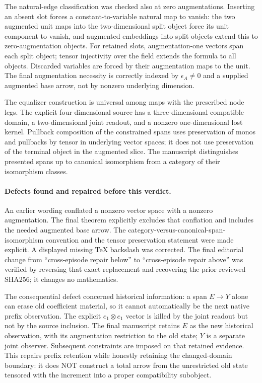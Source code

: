 \documentclass{article}
\begin{document}
The natural-edge classification was checked also at zero augmentations. Inserting an absent slot forces a constant-to-variable natural map to vanish: the two augmented unit maps into the two-dimensional split object force its unit component to vanish, and augmented embeddings into split objects extend this to zero-augmentation objects. For retained slots, augmentation-one vectors span each split object; tensor injectivity over the field extends the formula to all objects. Discarded variables are forced by their augmentation maps to the unit. The final augmentation necessity is correctly indexed by $\epsilon_A\ne0$ and a supplied augmented base arrow, not by nonzero underlying dimension.

The equalizer construction is universal among maps with the prescribed node legs. The explicit four-dimensional source has a three-dimensional compatible domain, a two-dimensional joint readout, and a nonzero one-dimensional lost kernel. Pullback composition of the constrained spans uses preservation of monos and pullbacks by tensor in underlying vector spaces; it does not use preservation of the terminal object in the augmented slice. The manuscript distinguishes presented spans up to canonical isomorphism from a category of their isomorphism classes.

\paragraph{Defects found and repaired before this verdict.}
An earlier wording conflated a nonzero vector space with a nonzero augmentation. The final theorem explicitly excludes that conflation and includes the needed augmented base arrow. The category-versus-canonical-span-isomorphism convention and the tensor preservation statement were made explicit. A displayed missing TeX backslash was corrected. The final editorial change from ``cross-episode repair below'' to ``cross-episode repair above'' was verified by reversing that exact replacement and recovering the prior reviewed SHA256; it changes no mathematics.

The consequential defect concerned historical information: a span $E\to Y$ alone can erase old coefficient material, so it cannot automatically be the next native prefix observation. The explicit $e_1\otimes e_1$ vector is killed by the joint readout but not by the source inclusion. The final manuscript retains $E$ as the new historical observation, with its augmentation restriction to the old state; $Y$ is a separate joint observer. Subsequent constraints are imposed on that retained evidence. This repairs prefix retention while honestly retaining the changed-domain boundary: it does NOT construct a total arrow from the unrestricted old state tensored with the increment into a proper compatibility subobject.
\end{document}
